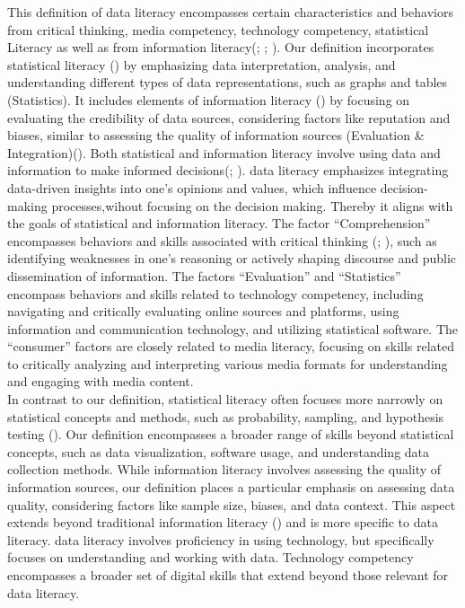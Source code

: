 \documentclass[
  12pt,
  a4paper,
  twoside]{article}
\begin{document}
This definition of data literacy encompasses certain characteristics and behaviors from critical thinking, media competency, technology competency, statistical Literacy as well as from information literacy(; ; ).
Our definition incorporates statistical literacy () by emphasizing data interpretation, analysis, and understanding different types of data representations, such as graphs and tables (Statistics). It includes elements of information literacy () by focusing on evaluating the credibility of data sources, considering factors like reputation and biases, similar to assessing the quality of information sources (Evaluation \& Integration)(). Both statistical and information literacy involve using data and information to make informed decisions(; ). data literacy emphasizes integrating data-driven insights into one's opinions and values, which influence decision-making processes,wihout focusing on the decision making. Thereby it aligns with the goals of statistical and information literacy. The factor ``Comprehension'' encompasses behaviors and skills associated with critical thinking (; ), such as identifying weaknesses in one's reasoning or actively shaping discourse and public dissemination of information. The factors ``Evaluation'' and ``Statistics'' encompass behaviors and skills related to technology competency, including navigating and critically evaluating online sources and platforms, using information and communication technology, and utilizing statistical software. The ``consumer'' factors are closely related to media literacy, focusing on skills related to critically analyzing and interpreting various media formats for understanding and engaging with media content.\\
In contrast to our definition, statistical literacy often focuses more narrowly on statistical concepts and methods, such as probability, sampling, and hypothesis testing (). Our definition encompasses a broader range of skills beyond statistical concepts, such as data visualization, software usage, and understanding data collection methods. While information literacy involves assessing the quality of information sources, our definition places a particular emphasis on assessing data quality, considering factors like sample size, biases, and data context. This aspect extends beyond traditional information literacy () and is more specific to data literacy. data literacy involves proficiency in using technology, but specifically focuses on understanding and working with data. Technology competency encompasses a broader set of digital skills that extend beyond those relevant for data literacy.
\end{document}
